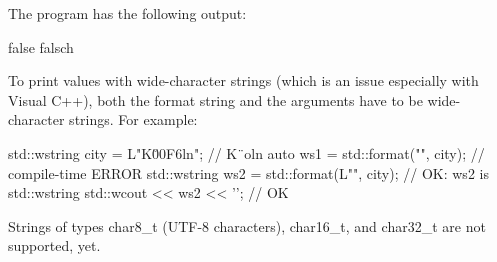 The program has the following output:

\begin{shell}
false falsch
\end{shell}

To print values with wide-character strings (which is an issue especially with Visual C++), both the format string and the arguments have to be wide-character strings. For example:

\begin{cpp}
std::wstring city = L"K\u00F6ln"; // K¨oln
auto ws1 = std::format("{}", city); // compile-time ERROR
std::wstring ws2 = std::format(L"{}", city); // OK: ws2 is std::wstring
std::wcout << ws2 << '\n'; // OK
\end{cpp}

Strings of types char8\_t (UTF-8 characters), char16\_t, and char32\_t are not supported, yet.






